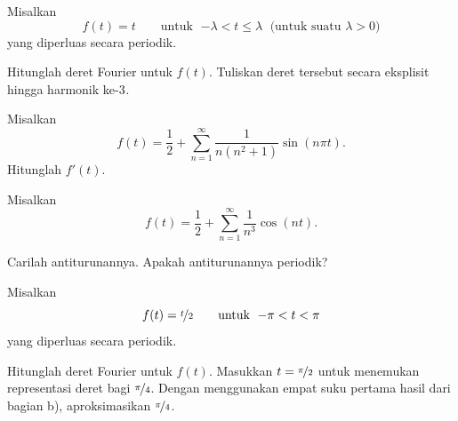 \begin{exercise}
Misalkan
\begin{equation*}
f(t) = t \qquad \text{untuk } \; {-\lambda} < t \leq \lambda \; \text{ (untuk suatu } \lambda > 0 \text{)}
\end{equation*}
yang diperluas secara periodik.
\begin{tasks}
\task Hitunglah deret Fourier untuk $f(t)$.
\task Tuliskan deret tersebut secara eksplisit hingga harmonik ke-$3^{\text{}}$.
\end{tasks}
\end{exercise}

\begin{exercise}
Misalkan
\begin{equation*}
f(t) = \frac{1}{2} + \sum_{n=1}^\infty
\frac{1}{n(n^2+1)}
\sin(n\pi t) .
\end{equation*}
Hitunglah $f'(t)$.
\end{exercise}

\begin{exercise}
\pagebreak[2]
Misalkan
\begin{equation*}
f(t) = \frac{1}{2} + \sum_{n=1}^\infty
\frac{1}{n^3}
\cos(n t) .
\end{equation*}
\begin{tasks}
\task Carilah antiturunannya.
\task Apakah antiturunannya periodik?
\end{tasks}
\end{exercise}

\begin{exercise}
Misalkan
\begin{equation*}
f(t) = \nicefrac{t}{2} \qquad \text{untuk } \; {-\pi} < t < \pi
\end{equation*}
yang diperluas secara periodik.
\begin{tasks}
\task Hitunglah deret Fourier untuk $f(t)$.
\task Masukkan $t=\nicefrac{\pi}{2}$ untuk menemukan representasi deret
bagi $\nicefrac{\pi}{4}$.
\task Dengan menggunakan empat suku pertama hasil dari bagian b), aproksimasikan
$\nicefrac{\pi}{4}$.
\end{tasks}
\end{exercise}

